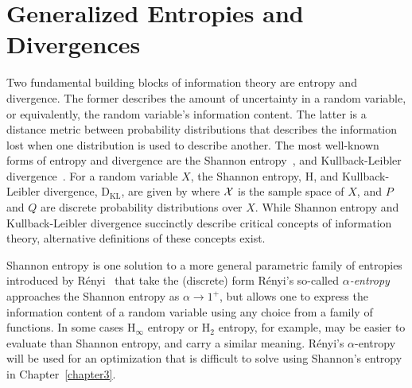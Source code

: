 \section{Generalized Entropies and Divergences}
\label{sec:entropy_and_divergence}

Two fundamental building blocks of information theory are entropy and
divergence. The former describes the amount of uncertainty in a random variable,
or equivalently, the random variable's information content. The latter is a
distance metric between probability distributions that describes the
information lost when one distribution is used to describe another.
The most well-known forms of entropy and divergence are the Shannon
entropy~\cite{shannon1948mathematical}, and
Kullback-Leibler divergence~\cite{kullback1951information}. For a random variable
$X$, the Shannon entropy, $\text{H}$, and Kullback-Leibler divergence,
$\text{D}_{\text{KL}}$, are given by
%
%
where $\mathcal{X}$ is the sample space of $X$, and $P$ and $Q$ are discrete probability
distributions over $X$. While Shannon entropy and Kullback-Leibler divergence
succinctly describe critical concepts of information theory, alternative definitions of
these concepts exist.

Shannon entropy is one solution to a more general parametric family of
entropies introduced by R\'{e}nyi~\cite{renyi1961measures} that take the
(discrete) form
%
%
R\'{e}nyi's so-called \textit{$\alpha$-entropy} approaches the Shannon entropy as $\alpha
\rightarrow 1^{+}$, but allows one to express the information content of a
random variable using any choice from a family of functions. In some cases
$\text{H}_{\infty}$ entropy or $\text{H}_{2}$ entropy, for example, may be
easier to evaluate than Shannon entropy, and carry a similar meaning.
R\'{e}nyi's $\alpha$-entropy will be
used for an optimization that is difficult to solve using Shannon's entropy in
Chapter~\ref{chapter3}.

